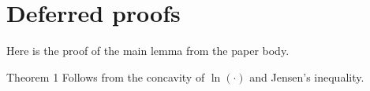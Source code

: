 \documentclass[anon]{alt2027} %
\begin{document}
% 

\appendix


\section{Deferred proofs}

Here is the proof of the main lemma from the paper body.

\begin{proofof}{Theorem 1}
  Follows from the concavity of $\ln(\cdot)$ and Jensen's inequality.
\end{proofof}
\end{document}
